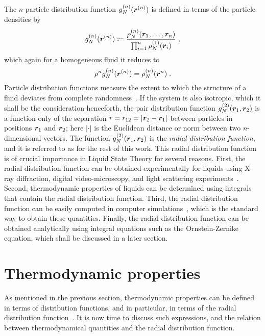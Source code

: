 The $n$-particle distribution function $g^{(n)}_{N} (\bm{r}^{(n)})$ is defined in terms
of the particle densities by
\begin{equation}
    g^{(n)}_{N} (\bm{r}^{(n)}) \coloneqq \frac{\rho^{(n)}_{N} (\bm{r}_{1}, \dots , \bm{r}_{n})}
    {\prod_{i=1}^{n} \rho^{(1)}_{N} (\bm{r}_{i})} \; ,
    \label{eq:gr-def}
\end{equation}
which again for a homogeneous fluid it reduces to
\begin{equation}
    \rho^{n} g^{(n)}_{N} (\bm{r}^{(n)}) = \rho^{(n)}_{N} (\bm{r}^{n}) \; .
    \label{eq:homogenous-gr}
\end{equation}
Particle distribution functions measure the extent to which the structure of a fluid 
deviates from complete randomness~\cite{hansenTheorySimpleLiquids2013}.
If the system is also isotropic, which it shall be the consideration henceforth,
the pair distribution function $g^{(2)}_{N} (\bm{r}_{1}, \bm{r}_{2})$ is a function only
of the separation $r = r_{12} = \lvert \bm{r}_{2} - \bm{r}_{1} \rvert$ between particles
in positions $\bm{r}_{1}$ and $\bm{r}_{2}$; here $\lvert \cdot \rvert$ is the Euclidean
distance or norm between two $n$-dimensional vectors.
The function $g^{(2)}_{N} (\bm{r}_{1}, \bm{r}_{2})$ is the
\emph{radial distribution function}, and it is referred to as 
\rdf for the rest of this work.
This radial distribution function is of crucial importance in Liquid State Theory for
several reasons. First, the radial distribution function can be obtained experimentally
for liquids using X-ray diffraction, digital video-microscopy, and light scattering
experiments~\cite{mcquarrieStatisticalMechanics2000}.
Second, thermodynamic properties of liquids can be determined using integrals that
contain the radial distribution function. Third, the radial distribution function can
be easily computed in computer simulations~\cite{allenComputerSimulationLiquids2017}, 
which is the standard way to obtain these quantities. Finally, the radial distribution
function can be obtained analytically using integral equations such as the Ornstein-Zernike
equation, which shall be discussed in a later section.

\section{Thermodynamic properties} \label{sec:thermodynamics}
As mentioned in the previous section, thermodynamic properties can be defined in terms of
distribution functions, and in particular, in terms of the radial distribution
function~\cite{hansenTheorySimpleLiquids2013}.
It is now time to discuss such expressions, and the relation between thermodynamical
quantities and the radial distribution function.

